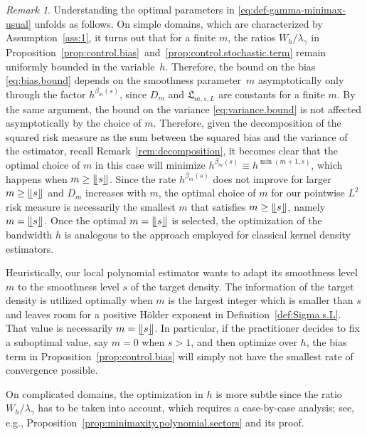 \documentclass[bj,authoryear]{imsart}
\numberwithin{equation}{section}
\theoremstyle{plain}
\theoremstyle{remark}
\newtheorem{remark}{Remark}
\newcommand{\1}{\mathds{1}}
\begin{document}
    \begin{remark}\upshape
        Understanding the optimal parameters in \eqref{eq:def-gamma-minimax-usual} unfolds as follows. On simple domains, which are characterized by Assumption~\ref{ass:1}, it turns out that for a finite $m$, the ratios $W_h / \lambda_{\gamma}$ in Proposition~\ref{prop:control.bias}~and~\ref{prop:control.stochastic.term} remain uniformly bounded in the variable~$h$. Therefore, the bound on the bias \eqref{eq:bias.bound} depends on the smoothness parameter~$m$ asymptotically only through the factor $h^{\beta_m(s)}$, since $D_m$ and $\mathfrak{L}_{m,s,L}$ are constants for a finite $m$. By the same argument, the bound on the variance \eqref{eq:variance.bound} is not affected asymptotically by the choice of $m$. Therefore, given the decomposition of the squared risk measure as the sum between the squared bias and the variance of the estimator, recall Remark~\ref{rem:decomposition}, it becomes clear that the optimal choice of $m$ in this case will minimize $h^{\beta_m(s)} \equiv h^{\min(m+1,s)}$, which happens when $m\geq \llfloor s \rrfloor$. Since the rate $h^{\beta_m(s)}$ does not improve for larger $m\geq\llfloor s \rrfloor$ and $D_m$ increases with $m$, the optimal choice of $m$ for our pointwise $L^2$ risk measure is necessarily the smallest $m$ that satisfies $m\geq \llfloor s \rrfloor$, namely $m = \llfloor s \rrfloor$. Once the optimal $m = \llfloor s \rrfloor$ is selected, the optimization of the bandwidth $h$ is analogous to the approach employed for classical kernel density estimators.

        Heuristically, our local polynomial estimator wants to adapt its smoothness level $m$ to the smoothness level $s$ of the target density. The information of the target density is utilized optimally when $m$ is the largest integer which is smaller than $s$ and leaves room for a positive H\"older exponent in Definition~\ref{def:Sigma.s.L}. That value is necessarily $m = \llfloor s \rrfloor$. In particular, if the practitioner decides to fix a suboptimal value, say $m = 0$ when $s > 1$, and then optimize over $h$, the bias term in Proposition~\ref{prop:control.bias} will simply not have the smallest rate of convergence possible.

        On complicated domains, the optimization in $h$ is more subtle since the ratio $W_h / \lambda_{\gamma}$ has to be taken into account, which requires a case-by-case analysis; see, e.g., Proposition~\ref{prop:minimaxity.polynomial.sectors} and its proof.
    \end{remark}
\end{document}
